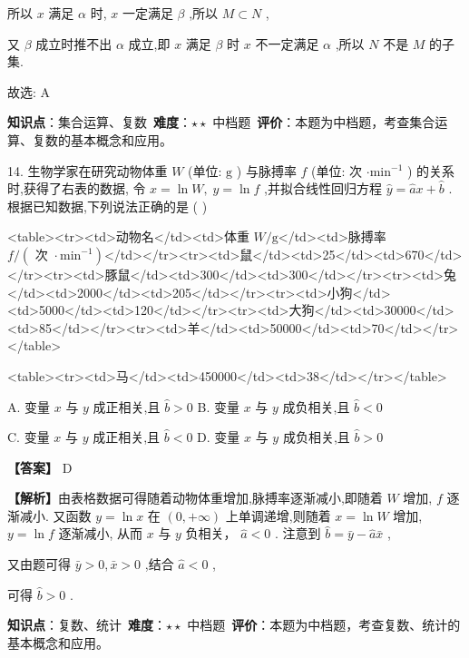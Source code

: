 \documentclass[10pt]{article}
\begin{document}
所以 \(x\) 满足 \(\alpha\) 时, \(x\) 一定满足 \(\beta\) ,所以 \(M \subset  N\) ,

又 \(\beta\) 成立时推不出 \(\alpha\) 成立,即 \(x\) 满足 \(\beta\) 时 \(x\) 不一定满足 \(\alpha\) ,所以 \(N\) 不是 \(M\) 的子集.

故选: A

\begin{analysisbox}[考点分析]
\textbf{知识点}：集合运算、复数\
\textbf{难度}：$\star\star$ 中档题\
\textbf{评价}：本题为中档题，考查集合运算、复数的基本概念和应用。
\end{analysisbox}

14. 生物学家在研究动物体重 \(W\) (单位: \(\mathrm{g}\) ) 与脉搏率 \(f\) (单位: 次 \(\cdot  {\mathrm{{min}}}^{-1}\) ) 的关系时,获得了右表的数据, 令 \(x = \ln W,\;y = \ln f\) ,并拟合线性回归方程 \(\widehat{y} = \widehat{a}x + \widehat{b}\) . 根据已知数据,下列说法正确的是 ( )

<table><tr><td>动物名</td><td>体重 \(W/\mathrm{g}\)</td><td>脉搏率 \(f/\left( {\text{ 次 } \cdot  {\mathrm{{min}}}^{-1}}\right)\)</td></tr><tr><td>鼠</td><td>25</td><td>670</td></tr><tr><td>豚鼠</td><td>300</td><td>300</td></tr><tr><td>兔</td><td>2000</td><td>205</td></tr><tr><td>小狗</td><td>5000</td><td>120</td></tr><tr><td>大狗</td><td>30000</td><td>85</td></tr><tr><td>羊</td><td>50000</td><td>70</td></tr></table>

<table><tr><td>马</td><td>450000</td><td>38</td></tr></table>

A. 变量 \(x\) 与 \(y\) 成正相关,且 \(\widehat{b} > 0\) B. 变量 \(x\) 与 \(y\) 成负相关,且 \(\widehat{b} < 0\)

C. 变量 \(x\) 与 \(y\) 成正相关,且 \(\widehat{b} < 0\) D. 变量 \(x\) 与 \(y\) 成负相关,且 \(\widehat{b} > 0\)

\textbf{【答案】} D

\textbf{【解析】}由表格数据可得随着动物体重增加,脉搏率逐渐减小,即随着 \(W\) 增加, \(f\) 逐渐减小. 又函数 \(y = \ln x\) 在 \(\left( {0, + \infty }\right)\) 上单调递增,则随着 \(x = \ln W\) 增加, \(y = \ln f\) 逐渐减小, 从而 \(x\) 与 \(y\) 负相关， \(\widehat{a} < 0\) . 注意到 \(\widehat{b} = \bar{y} - \widehat{a}\bar{x}\) ,

又由题可得 \(\bar{y} > 0,\bar{x} > 0\) ,结合 \(\widehat{a} < 0\) ,

可得 \(\widehat{b} > 0\) .

\begin{analysisbox}[考点分析]
\textbf{知识点}：复数、统计\
\textbf{难度}：$\star\star$ 中档题\
\textbf{评价}：本题为中档题，考查复数、统计的基本概念和应用。
\end{analysisbox}
\end{document}
